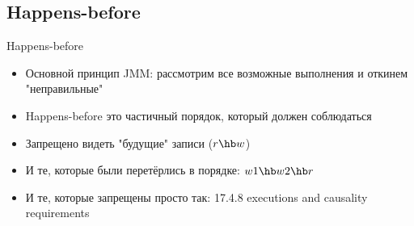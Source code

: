 \ifrender
\subsection{Happens-before}
\begin{frame}{Happens-before}
\begin{itemize}[<+->]
\item Основной принцип JMM: рассмотрим все возможные выполнения и откинем "неправильные"
\item Happens-before это частичный порядок, который должен соблюдаться
\item Запрещено видеть "будущие" записи ($r \hb w$)
\item И те, которые были перетёрлись в {\hbbox} порядке: $w1 \hb w2 \hb r$
\item И те, которые запрещены просто так: 17.4.8 executions and causality requirements
\end{itemize}
\end{frame}
\fi
